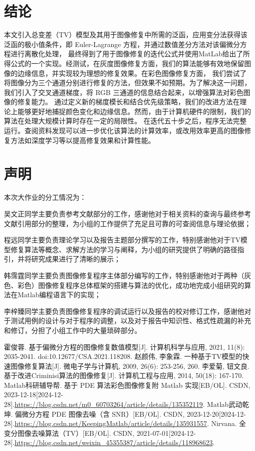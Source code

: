 \documentclass[UTF8]{ctexart}
\begin{document}
\section{结论}
本文引入总变差（TV）模型及其用于图像修复中所需的泛函，应用变分法获得该泛函的极小值条件，即 Euler-Lagrange 方程，并通过数值差分方法对该偏微分方程进行离散化处理，
最终得到了用于图像修复的迭代公式并使用MatLab给出了所得公式的一个实现。经测试，在灰度图像修复方面，我们的算法能够有效地保留图像的边缘信息，并实现较为理想的修复效果。在彩色图像修复方面，
我们尝试了将图像分为三个通道分别进行修复的方法，但效果不如预期。为了解决这一问题，我们引入了交叉通道梯度，将 RGB 三通道的信息结合起来，以增强算法对彩色图像的修复能力。
通过定义新的梯度模长和结合优先级策略，我们的改进方法在理论上能够更好地捕捉颜色变化和边缘信息。然而，由于计算机硬件的限制，我们的算法在处理大规模计算时存在一定的局限性。
在迭代五十步之后，程序无法完整运行。查阅资料发现可以进一步优化该算法的计算效率，或改用效率更高的图像修复方法如深度学习等以提高修复效果和计算性能。
\section{声明}


本次大作业的分工情况为：

吴文正同学主要负责参考文献部分的工作，感谢他对于相关资料的查询与最终参考文献引用部分的整理，为小组的工作提供了充足且可靠的可查阅信息与理论依据；

程远同学主要负责理论学习以及报告主题部分撰写的工作，特别感谢他对于TV模型修复算法等概念、求解方法的学习与阐释，为小组的研究提供了明确的路径指引，并将研究成果进行了清晰的展示；

韩霈霆同学主要负责图像修复程序主体部分编写的工作，特别感谢他对于两种（灰色、彩色）图像修复程序总体框架的搭建与算法的优化，成功地完成小组研究的算法在Matlab编程语言下的实现；

李梓臻同学主要负责图像修复程序的调试运行以及报告的校对修订工作，感谢他对于测试用例的设计与对于程序的调整，以及对于报告中知识性、格式性疏漏的补充和修订，分担了小组工作中的大量琐碎部分。

\begin{thebibliography}{99}
     霍俊蓉. 基于偏微分方程的图像修复数值模型[J]. 计算机科学与应用, 2021, 11(8): 2035-2041. doi:10.12677/CSA.2021.118208.
     赵颜伟, 李象霖. 一种基于TV模型的快速图像修复算法[J]. 微电子学与计算机, 2009, 26(6): 253-256, 260.
     李爱菊, 钮文良. 基于改进Criminisi算法的图像修复[J]. 计算机工程与应用, 2014, 50(18): 167-170.
     Matlab科研辅导帮. 基于 PDE 算法彩色图像修复附 Matlab 实现[EB/OL]. CSDN, 2023-12-18[2024-12-28].\url{https://blog.csdn.net/m0_60703264/article/details/135352119}.
     Matlab武动乾坤. 偏微分方程 PDE 图像去噪（含 SNR）[EB/OL]. CSDN, 2023-12-20[2024-12-28].\url{https://blog.csdn.net/KeepingMatlab/article/details/135931557}.
     Nirvana. 全变分图像去噪算法（TV）[EB/OL]. CSDN, 2021-07-01[2024-12-28].\url{https://blog.csdn.net/weixin_45355387/article/details/118968623}.
\end{thebibliography}
\end{document}
